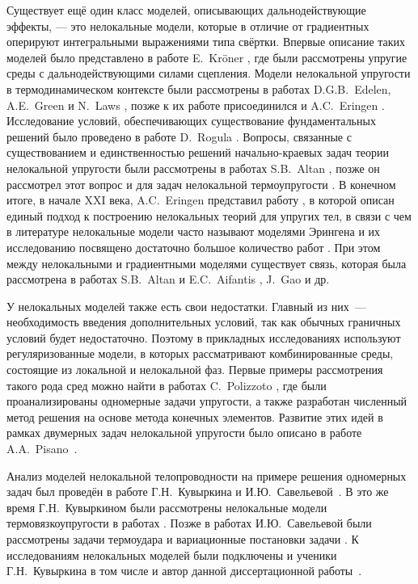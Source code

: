 \ifsynopsis
\else
Существует ещё один класс моделей, описывающих дальнодействующие эффекты, --- это нелокальные модели, которые в отличие от градиентных оперируют интегральными выражениями типа свёртки. Впервые описание таких моделей было представлено в работе E.~Kr{\"o}ner \cite{Kroner}, где были рассмотрены упругие среды с дальнодействующими силами сцепления. Модели нелокальной упругости в термодинамическом контексте были рассмотрены в работах D.G.B.~Edelen, A.E.~Green и N.~Laws \cite{Edelen1, Edelen2}, позже к их работе присоединился и A.C.~Eringen \cite{Eringen5, Eringen6}. Исследование условий, обеспечивающих существование фундаментальных решений было проведено в работе D.~Rogula \cite{Rogula1982}. Вопросы, связанные с существованием и единственностью решений начально-краевых задач теории нелокальной упругости были рассмотрены в работах S.B.~Altan \mbox{\cite{Altan1, Altan2},} позже он рассмотрел этот вопрос и для задач нелокальной термоупругости \mbox{\cite{Altan3, Altan4}.} В конечном итоге, в начале XXI века, A.C.~Eringen представил работу \cite{Eringen1}, в которой описан единый подход к построению нелокальных теорий для упругих тел, в связи с чем в литературе нелокальные модели часто называют моделями Эрингена и их исследованию посвящено достаточно большое количество работ \cite{BondaryLayer, Tuna, Rahmani}. При этом между нелокальными и градиентными моделями существует связь, которая была рассмотрена в работах S.B.~Altan и E.C.~Aifantis \cite{Aifantis3}, J.~Gao \cite{Gao} и др.
\fi

\ifsynopsis
\else
У нелокальных моделей также есть свои недостатки. Главный из них~--- необходимость введения дополнительных условий, так как обычных граничных условий будет недостаточно. Поэтому в прикладных исследованиях используют регуляризованные модели, в которых рассматривают комбинированные среды, состоящие из локальной и нелокальной фаз. Первые примеры рассмотрения такого рода сред можно найти в работах C.~Polizzoto \cite{Polizzotto1, Polizzotto2}, где были проанализированы одномерные задачи упругости, а также разработан численный метод решения на основе метода конечных элементов. Развитие этих идей в рамках двумерных задач нелокальной упругости было описано в работе A.A.~Pisano~\cite{Pisano1}.
\fi

\ifsynopsis
\else
Анализ моделей нелокальной телопроводности на примере решения одномерных задач был проведён в работе Г.Н.~Кувыркина и И.Ю.~Савельевой~\cite{NonlocalThermal1}. В это же время Г.Н.~Кувыркином были рассмотрены нелокальные модели термовязкоупругости в работах \cite{ThermoViscoElasticity1, ThermoViscoElasticity2, ThermoViscoElasticity3}. Позже в работах И.Ю.~Савельевой были рассмотрены задачи термоудара \cite{ThermoUdar1, ThermoUdar2, ThermoUdar3} и вариационные постановки задачи \cite{NonlocalThermalVariation1, NonlocalThermalVariation2}. К исследованиям нелокальных моделей были подключены и ученики Г.Н.~Кувыркина в том числе и автор данной диссертационной работы~\mbox{\cite{AMCSM2019, ZAMM, NonlocalSaintVenant, NonlocalRadiation}.}
\fi

